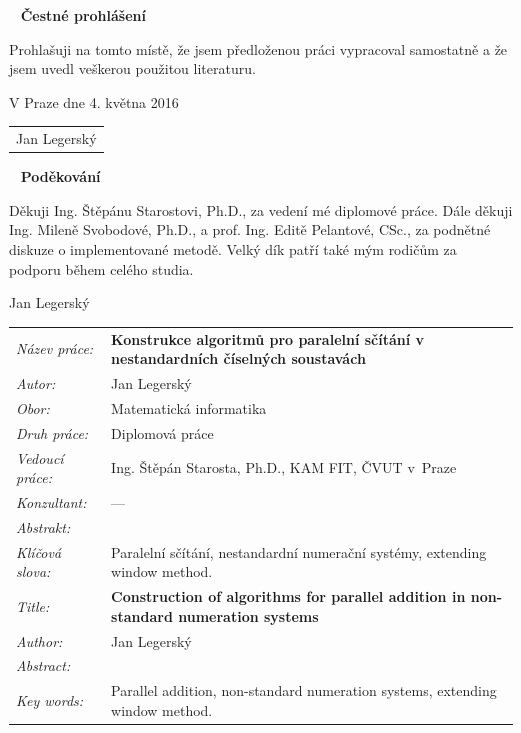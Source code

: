 \documentclass[a4paper, 11pt, twoside, openright]{report}
\theoremstyle{definition}
\newcommand{\obor}{Matematická informatika}
\newcommand{\nazevcz}{Konstrukce algoritm\r u pro paraleln\'i s\v c\'it\'an\'i  v nestandardn\'ich \v c\'iseln\'ych soustav\'ach}
\newcommand{\nazeven}{Construction of algorithms for parallel addition   in non-standard numeration systems}
\newcommand{\autor}{Jan Legersk\'y}
\newcommand{\vedouci}{Ing. \v St\v ep\'an Starosta, Ph.D.}
\newcommand{\pracovisteVed}{KAM FIT, \v CVUT v~Praze}
\newcommand{\konzultant}{---}
\newcommand{\klicova}{Paraleln\'i s\v c\'it\'an\'i, nestandardn\'i numera\v cn\'i syst\'emy, extending window method.}  %
\newcommand{\keyword}{Parallel addition, non-standard numeration systems, extending window method.}
\newcommand{\abstrCZ}%
{%
}
\newcommand{\abstrEN}{
}
\begin{document}
\begin{titlepage}
\thispagestyle{empty}
~
\vfill
\noindent\textbf{Čestné prohlášení}
\vspace{0.5cm}

Prohla\v suji na tomto m\'ist\v e, \v ze jsem p\v redlo\v zenou pr\'aci vypracoval samostatn\v e a \v ze jsem uvedl ve\v skerou pou\v zitou literaturu.
\vspace{1.5cm}

\noindent
\vspace{5mm}V Praze dne 4. května 2016\hfill
	\begin{tabular}{c}
	\\[40pt]
	\autor
	\end{tabular}
\cleardoublepage


\thispagestyle{empty}
~
\vfill
\noindent\textbf{Pod\v ekov\'an\'i}
\vspace{0.5cm}

Děkuji Ing. Štěpánu Starostovi, Ph.D., za vedení mé diplomové práce. Dále děkuji Ing. Mileně Svobodové, Ph.D., a prof. Ing. Editě Pelantové, CSc., za  podnětné diskuze o implementované metodě. Velký dík patří také mým rodičům za podporu během celého studia.

\begin{flushright}
\autor
\end{flushright}
\cleardoublepage


\thispagestyle{empty}

\noindent
\begin{tabular}{lp{}}
  {\em N\'azev pr\'ace:} & \bf \nazevcz \\[4mm]
  {\em Autor:} & \autor \\[4mm]
  {\em Obor:} & \obor \\[4mm]
  {\em Druh pr\'ace:} & Diplomová práce \\[4mm]
  {\em Vedoucí práce:} & \vedouci, \pracovisteVed \\[4mm]
  {\em Konzultant:} & \konzultant \\[4mm]
  {\em Abstrakt:} & \abstrCZ \\[4mm]
  {\em Kl\'i\v cov\'a slova:} & \klicova \\[20mm]

  {\em Title:} & \bf \nazeven \\[4mm]
  {\em Author:} & \autor \\[4mm]
  {\em Abstract:} & \abstrEN \\[4mm]
  {\em Key words:} & \keyword
\end{tabular}
\cleardoublepage


\thispagestyle{empty}
\renewcommand\contentsname{\vspace{-3cm} Contents \vspace{-0.8cm}}
\tableofcontents
\thispagestyle{empty}

\cleardoublepage
\thispagestyle{empty}

\thispagestyle{empty}
\cleardoublepage
\end{titlepage}
\end{document}
